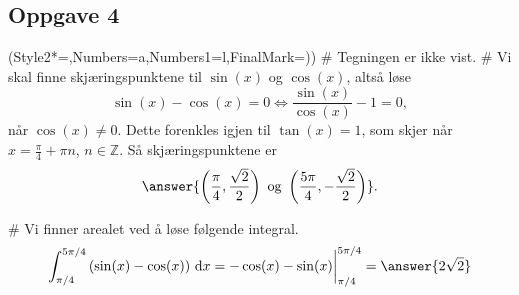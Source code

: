 \subsection*{Oppgave 4}

\begin{easylist}[enumerate]
	\ListProperties(Style2*=,Numbers=a,Numbers1=l,FinalMark={)})
	# Tegningen er ikke vist.
	# Vi skal finne skjæringspunktene til $\sin(x)$ og $\cos(x)$, altså løse
	\begin{equation*}
	\sin(x)-\cos(x)=0 \Longleftrightarrow \frac{\sin(x)}{\cos(x)} - 1 = 0,
	\end{equation*}
	når $\cos(x)\neq 0$. Dette forenkles igjen til $\tan(x)=1$, som skjer når $x=\frac{\pi}{4} + \pi n$, $n \in \mathbb{Z}$.
	Så skjæringspunktene er
	\begin{equation*}
	\answer{\left( \frac{\pi}{4}, \frac{\sqrt{2}}{2} \right) \text{ og } \left( \frac{5\pi}{4}, -\frac{\sqrt{2}}{{2}} \right)}.
	\end{equation*}

	# Vi finner arealet ved å løse følgende integral.
	\begin{equation*}
	\int_{\pi/4}^{5\pi/4} \left(\sin(x) - \cos(x)\right) \, \text{d}x = -\cos(x)-\sin(x)\bigg\vert_{\pi/4}^{5\pi/4} = \answer{2\sqrt{2}}
	\end{equation*}
\end{easylist}

